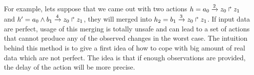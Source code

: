 For example, lets suppose that we came out with two actions $h=a_0\xrightarrow{2} z_0 \Rsh z_1$ and $h'=a_0 \wedge b_1 \xrightarrow{4} z_0 \Rsh z_1$, they will merged into $h_2=b_1\xrightarrow{3} z_0 \Rsh z_1$.
If input data are perfect, usage of this merging is totally unsafe and can lead to a set of actions that cannot produce any of the observed changes in the worst case.
The intuition behind this method is to give a first idea of how to cope with big amount of real data which are not perfect.
The idea is that if enough observations are provided, the delay of the action will be more precise.
